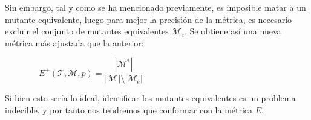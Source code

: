 Sin embargo, tal y como se ha mencionado previamente, es imposible matar a un mutante equivalente, luego para mejor la precisión de la métrica, es necesario excluir el conjunto de mutantes equivalentes $\mathcal{M}_e$. Se obtiene así una nueva métrica más ajustada que la anterior:

$\hspace{48pt}E^+(\mathcal{T},\mathcal{M},p) = \dfrac{|\mathcal{M}^*|}{|\mathcal{M} \,|\setminus|\mathcal{M}_e|}$

Si bien esto sería lo ideal, identificar los mutantes equivalentes es un problema indecible, y por tanto nos tendremos que conformar con la métrica $E$.